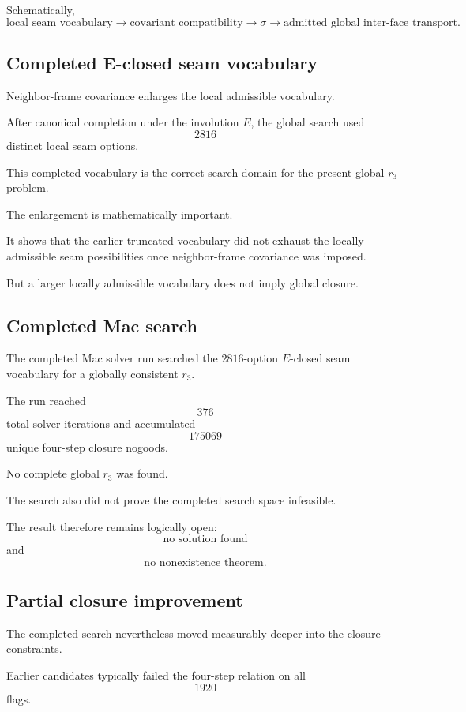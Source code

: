 Schematically,
\[
\text{local seam vocabulary}
\longrightarrow
\text{covariant compatibility}
\longrightarrow
\sigma
\longrightarrow
\text{admitted global inter-face transport}.
\]

\subsection{Completed E-closed seam vocabulary}

Neighbor-frame covariance enlarges the local admissible vocabulary.

After canonical completion under the involution \(E\), the global
search used
\[
2816
\]
distinct local seam options.

This completed vocabulary is the correct search domain for the
present global \(r_3\) problem.

The enlargement is mathematically important.

It shows that the earlier truncated vocabulary did not exhaust the
locally admissible seam possibilities once neighbor-frame covariance
was imposed.

But a larger locally admissible vocabulary does not imply global
closure.

\subsection{Completed Mac search}

The completed Mac solver run searched the \(2816\)-option
\(E\)-closed seam vocabulary for a globally consistent \(r_3\).

The run reached
\[
376
\]
total solver iterations and accumulated
\[
175069
\]
unique four-step closure nogoods.

No complete global \(r_3\) was found.

The search also did not prove the completed search space infeasible.

The result therefore remains logically open:
\[
\text{no solution found}
\]
and
\[
\text{no nonexistence theorem}.
\]

\subsection{Partial closure improvement}

The completed search nevertheless moved measurably deeper into the
closure constraints.

Earlier candidates typically failed the four-step relation on all
\[
1920
\]
flags.

